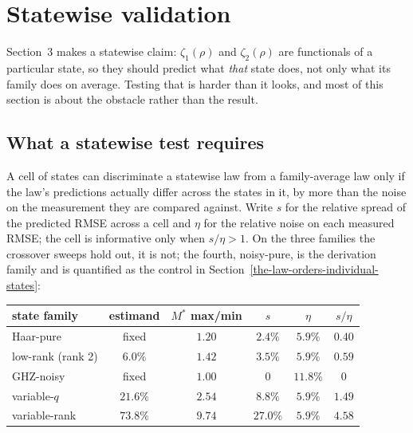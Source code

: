 \hypertarget{statewise-validation}{%
\section{\texorpdfstring{Statewise validation}{Statewise validation}}\label{sec:statewise}}

Section~3 makes a statewise claim: \(\zeta_1(\rho)\) and \(\zeta_2(\rho)\) are functionals of a
particular state, so they should predict what \emph{that} state does, not only what its family
does on average. Testing that is harder than it looks, and most of this section is about the
obstacle rather than the result.

\hypertarget{what-a-statewise-test-requires}{%
\subsection{What a statewise test requires}\label{what-a-statewise-test-requires}}

A cell of states can discriminate a statewise law from a family-average law only if the law's
predictions actually differ across the states in it, by more than the noise on the measurement
they are compared against. Write \(s\) for the relative spread of the predicted RMSE across a
cell and \(\eta\) for the relative noise on each measured RMSE; the cell is informative only when
\(s/\eta > 1\). On the three families the crossover sweeps hold out, it is not; the
fourth, noisy-pure, is the derivation family and is quantified as the control in
Section~\ref{the-law-orders-individual-states}:

\begin{center}
\begin{tabular}{lccccc}
\hline
state family & estimand & \(M^*\) max/min & \(s\) & \(\eta\) & \(s/\eta\) \\
\hline
Haar-pure          & fixed   & \(1.20\) & \(2.4\%\)  & \(5.9\%\)  & \(0.40\) \\
low-rank (rank 2)  & \(6.0\%\) & \(1.42\) & \(3.5\%\)  & \(5.9\%\)  & \(0.59\) \\
GHZ-noisy          & fixed   & \(1.00\) & \(0\)      & \(11.8\%\) & \(0\) \\
\hline
variable-\(q\)     & \(21.6\%\) & \(2.54\) & \(8.8\%\)  & \(5.9\%\)  & \(1.49\) \\
variable-rank      & \(73.8\%\) & \(9.74\) & \(27.0\%\) & \(5.9\%\)  & \(4.58\) \\
\hline
\end{tabular}
\end{center}


